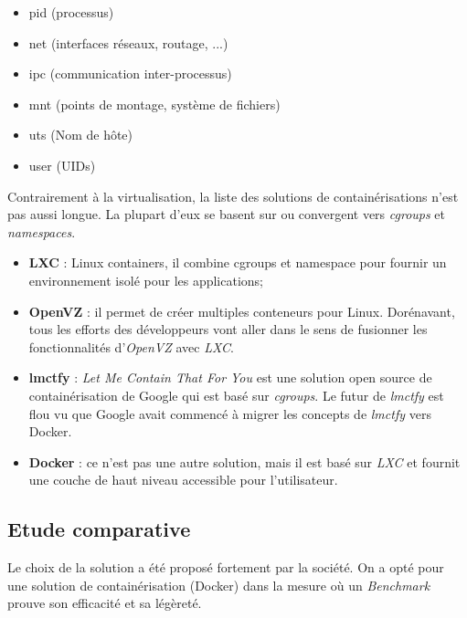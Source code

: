 \begin{onehalfspace}
\begin{itemize}
\begin{itemize}
\item pid (processus)
\item net (interfaces réseaux, routage, ...)
\item ipc (communication inter-processus)
\item mnt (points de montage, système de fichiers)
\item uts (Nom de hôte)
\item user (UIDs)
\end{itemize}

\end{itemize}


Contrairement à la virtualisation, la liste des solutions de containérisations n'est pas aussi longue. La plupart d'eux se basent sur ou convergent vers \emph{cgroups} et \emph{namespaces}.

\begin{itemize}
\item \textbf{LXC} : Linux containers,  il combine cgroups et namespace pour fournir un environnement isolé pour les applications;
\item \textbf{OpenVZ} : il  permet de créer multiples conteneurs pour Linux. Dorénavant, tous les efforts des développeurs vont aller dans le sens de fusionner les fonctionnalités d'\emph{OpenVZ} avec \emph{LXC}.
\item \textbf{lmctfy} : \emph{Let Me Contain That For You} est une solution open source de containérisation de Google qui est basé sur \emph{cgroups}. Le futur de \emph{lmctfy} est flou vu que Google avait commencé à migrer les concepts de \emph{lmctfy} vers Docker.
\item \textbf{Docker} : ce n'est pas une autre solution, mais il est basé sur \emph{LXC} et fournit une couche de haut niveau accessible pour l’utilisateur.

\end{itemize}

\subsection{Etude comparative}

Le choix de la solution a été proposé fortement par la société. On a opté pour une solution de containérisation (Docker) dans la mesure où un \emph{Benchmark} prouve son efficacité et sa légèreté.



\end{onehalfspace}

